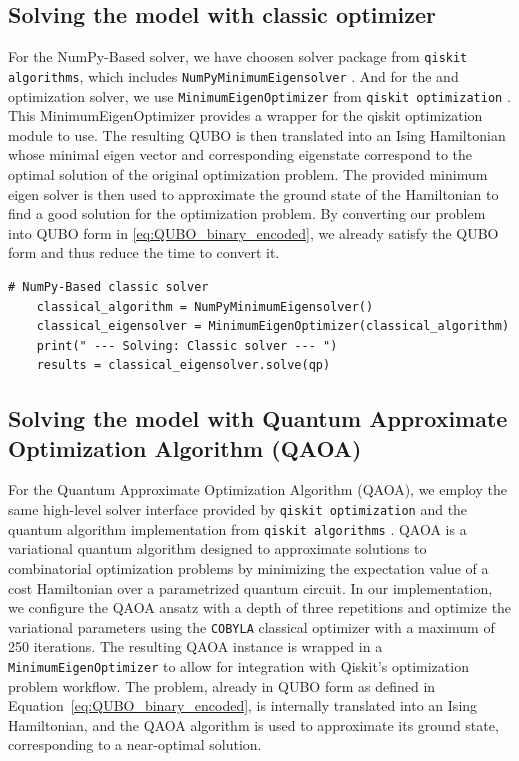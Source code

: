 \documentclass[12pt]{article}
\begin{document}
\subsection{Solving the model with classic optimizer}
For the NumPy-Based solver, we have choosen solver package from \texttt{qiskit algorithms}, which includes \texttt{NumPyMinimumEigensolver} \cite{Qiskit_Algorithms_API}. And for the and optimization solver, we use \texttt{MinimumEigenOptimizer} from \texttt{qiskit optimization} \cite{Qiskit_Optimization_API}. This MinimumEigenOptimizer provides a wrapper for the qiskit optimization module to use. The resulting QUBO is then translated into an Ising Hamiltonian whose minimal eigen vector and corresponding eigenstate correspond to the optimal solution of the original optimization problem. The provided minimum eigen solver is then used to approximate the ground state of the Hamiltonian to find a good solution for the optimization problem. By converting our problem into QUBO form in \ref{eq:QUBO_binary_encoded}, we already satisfy the QUBO form and thus reduce the time to convert it. 

\begin{lstlisting}[style=pythonstyle, caption={NumPy-based solver}]
    # NumPy-Based classic solver
    classical_algorithm = NumPyMinimumEigensolver()
    classical_eigensolver = MinimumEigenOptimizer(classical_algorithm)
    print(" --- Solving: Classic solver --- ")
    results = classical_eigensolver.solve(qp)
\end{lstlisting}

\subsection{Solving the model with  Quantum Approximate Optimization Algorithm (QAOA)}

For the Quantum Approximate Optimization Algorithm (QAOA), we employ the same high-level solver interface provided by \texttt{qiskit optimization} \cite{Qiskit_Optimization_API} and the quantum algorithm implementation from \texttt{qiskit algorithms} \cite{Qiskit_Algorithms_API}. QAOA is a variational quantum algorithm designed to approximate solutions to combinatorial optimization problems by minimizing the expectation value of a cost Hamiltonian over a parametrized quantum circuit. In our implementation, we configure the QAOA ansatz with a depth of three repetitions and optimize the variational parameters using the \texttt{COBYLA} classical optimizer with a maximum of 250 iterations. The resulting QAOA instance is wrapped in a \texttt{MinimumEigenOptimizer} to allow for integration with Qiskit's optimization problem workflow. The problem, already in QUBO form as defined in Equation~\ref{eq:QUBO_binary_encoded}, is internally translated into an Ising Hamiltonian, and the QAOA algorithm is used to approximate its ground state, corresponding to a near-optimal solution.
\end{document}
